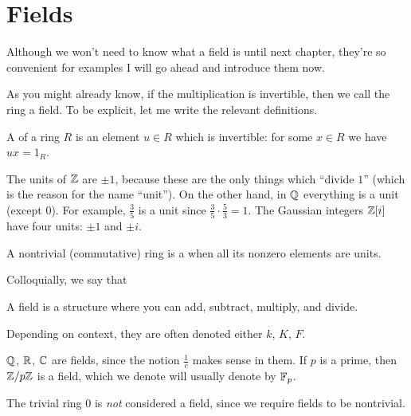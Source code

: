 \section{Fields}

Although we won't need to know what a field is until next chapter,
they're so convenient for examples I will go ahead and introduce them now.

As you might already know, if the multiplication is invertible,
then we call the ring a field.
To be explicit, let me write the relevant definitions.

\begin{definition}
	\label{def:unit}
	A  of a ring $R$
	is an element $u \in R$ which is invertible:
	for some $x \in R$ we have $ux = 1_R$.
\end{definition}

\begin{example}
	\listhack
	\begin{enumerate}[(a)]
	\ii The units of $\mathbb Z$ are $\pm 1$,
	because these are the only things which ``divide $1$''
	(which is the reason for the name ``unit'').
	\ii On the other hand, in $\mathbb Q$ everything is a unit (except $0$).
	For example, $\frac 35$ is a unit since
	$\frac 35 \cdot \frac 53 = 1$.
	\ii The Gaussian integers $\mathbb Z[i]$ have four units:
	$\pm 1$ and $\pm i$.
	\end{enumerate}
\end{example}

\begin{definition}
	A nontrivial (commutative) ring is a 
	when all its nonzero elements are units.
\end{definition}

Colloquially, we say that
\begin{moral}
	A field is a structure where you can add, subtract, multiply, and divide.
\end{moral}
Depending on context, they are often denoted
either $k$, $K$, $F$.

\begin{example}
	\listhack
	\begin{enumerate}[(a)]
		\ii $\mathbb Q$, $\mathbb R$, $\mathbb C$ are fields,
		since the notion $\frac 1c$ makes sense in them.
		\ii If $p$ is a prime, then $\mathbb Z/p\mathbb Z$ is a field,
		which we denote will usually denote by $\mathbb F_p$.
	\end{enumerate}
	The trivial ring $0$ is \emph{not} considered a field,
	since we require fields to be nontrivial.
\end{example}


